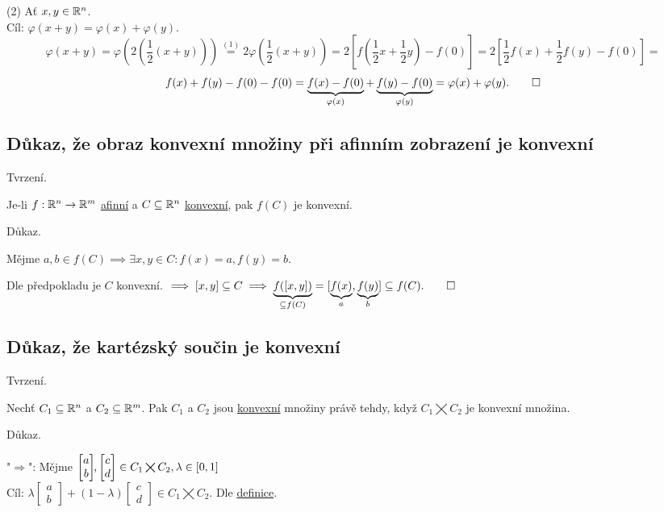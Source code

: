 (2) Ať $x, y \in \mathbb{R}^n$.\\
Cíl: $\varphi(x+y) = \varphi(x) + \varphi(y)$.
\[
    \varphi(x+y) = \varphi \left(2 \left(\frac{1}{2} (x+y)\right)\right) \stackrel{(1)}{=} 2 \varphi \left(\frac{1}{2} (x+y)\right) = 
    2 \left[f(\frac{1}{2}x + \frac{1}{2}y) - f(0)\right] = 2 \left[\frac{1}{2} f(x) + \frac{1}{2}f(y) - f(0) \right] = 
\]
\[
    f(x) + f(y) - f(0) - f(0) = \underbrace{f(x) - f(0)}_{\varphi(x)} + \underbrace{f(y) - f(0)}_{\varphi(y)} = 
    \varphi(x) + \varphi(y). \qed
\]

\subsection{Důkaz, že obraz konvexní množiny při afinním zobrazení je konvexní}
Tvrzení. 

Je-li $f: \mathbb{R}^n \rightarrow \mathbb{R}^m$ \hyperref[sec:afin]{afinní} a $C \subseteq \mathbb{R}^n$ \hyperref[sec:konvex]{konvexní}, pak 
$f(C)$ je konvexní.

Důkaz.

Mějme $a, b \in f(C) \implies \exists x, y \in C: f(x)=a, f(y)=b$.

Dle předpokladu je $C$ konvexní. $\implies [x, y] \subseteq C \implies \underbrace{f([x, y])}_{\subseteq f(C)} = 
[\underbrace{f(x)}_a, \underbrace{f(y)}_b] \subseteq f(C). \qed$

\subsection{Důkaz, že kartézský součin je konvexní}
Tvrzení.

Nechť $C_1 \subseteq \mathbb{R}^n$ a $C_2 \subseteq \mathbb{R}^m$. Pak $C_1$ a $C_2$ jsou \hyperref[sec:konvex]{konvexní} množiny právě tehdy, když 
$C_1 \bigtimes C_2$ je konvexní množina.

Důkaz.

"$\Rightarrow$": Mějme 
$
\begin{bmatrix}
    a \\
    b
\end{bmatrix}\hspace{-1mm}\text{,}
\begin{bmatrix}
    c \\
    d
\end{bmatrix} \in C_1 \bigtimes C_2, \lambda \in [0,1]$\\
Cíl: 
$
\lambda \begin{bmatrix}
    a \\
    b
\end{bmatrix}
+ (1-\lambda)
\begin{bmatrix}
    c \\
    d
\end{bmatrix} \in C_1 \bigtimes C_2.$ Dle \hyperref[sec:konvex]{definice}.

